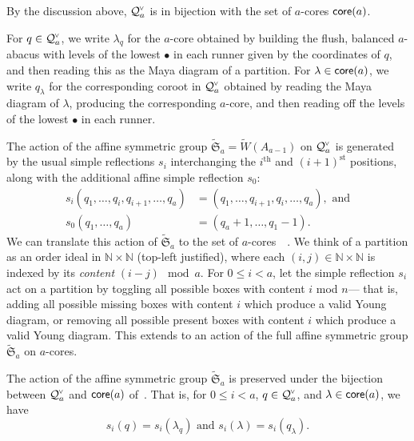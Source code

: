 \documentclass[ALCO,published]{cedram}
\newcommand{\darkblue}{\color{darkblue}} %
\newcommand{\defn}[1]{\emph{\darkblue #1}}
\newcommand{\chk}[1]{#1^{\normalfont\smash{\scalebox{.5}[.5]{\rotatebox{90}{\textbf{\textless}}}}}}
\newcommand{\wa}{\widetilde{W}}
\newcommand{\Q}{\mathcal{Q}}
\newcommand{\core}{{\sf core}}
\begin{document}
By the discussion above, $\chk{\Q}_{a}$ is in bijection with the set of $a$-cores $\core(a)$.

\begin{defi}\label{def:bij}
For $q \in \chk{\Q}_a$, we write $\lambda_q$ for the $a$-core obtained by building the flush, balanced $a$-abacus with levels of the lowest $\bullet$ in each runner given by the coordinates of $q$, and then reading this as the Maya diagram of a partition. For $\lambda \in \core(a)$, we write $q_\lambda$ for the corresponding coroot in $\chk{\Q}_a$ obtained by reading the Maya diagram of $\lambda$, producing the corresponding $a$-core, and then reading off the levels of the lowest $\bullet$ in each runner.
\end{defi}

The action of the affine symmetric group $\widetilde{\mathfrak{S}}_a=\wa(A_{a-1})$ on $\chk{\Q}_a$ is generated by the usual simple reflections $s_i$ interchanging the $i^\text{th}$ and $(i+1)^\text{st}$ positions, along with the additional affine simple reflection $s_0$: 
\begin{align*}
    s_i(q_1,\ldots,q_i,q_{i+1},\ldots,q_a) &= (q_1,\ldots,q_{i+1},q_i,\ldots,q_a), \text{ and}\\
    s_0(q_1,\ldots,q_a) &= (q_a+1,\ldots,q_1-1).
\end{align*}
We can translate this action of $\widetilde{\mathfrak{S}}_a$ to the set of $a$-cores~\cite[Section 2.7]{james1981representation}~\cite{lascoux2001ordering}. We think of a partition as an order ideal in $\mathbb{N} \times \mathbb{N}$ (top-left justified), where each $(i,j) \in \mathbb{N} \times \mathbb{N}$ is indexed by its \defn{content} $(i-j) \mod a$.   For $0 \leq i < a$, let the simple reflection $s_i$ act on a partition by toggling all possible boxes with content $i$ mod $n$--- that is, adding all possible missing boxes with content $i$ which produce a valid Young diagram, or removing all possible present boxes with content $i$ which produce a valid Young diagram.  This extends to an action of the full affine symmetric group $\widetilde{\mathfrak{S}}_a$ on $a$-cores.

\begin{theorem}
\label{thm:sa_eq}
The action of the affine symmetric group $\widetilde{\mathfrak{S}}_a$ is preserved under the bijection between $\chk{\Q}_a$ and $\core(a)$  of~.  That is, for $0 \leq i <a$, $q \in \chk{\Q}_a$, and $\lambda \in \core(a)$, we have \[s_i(q) = s_i(\lambda_q) \text{ and } s_i(\lambda) = s_i(q_\lambda).\]%
\end{theorem}
\end{document}

